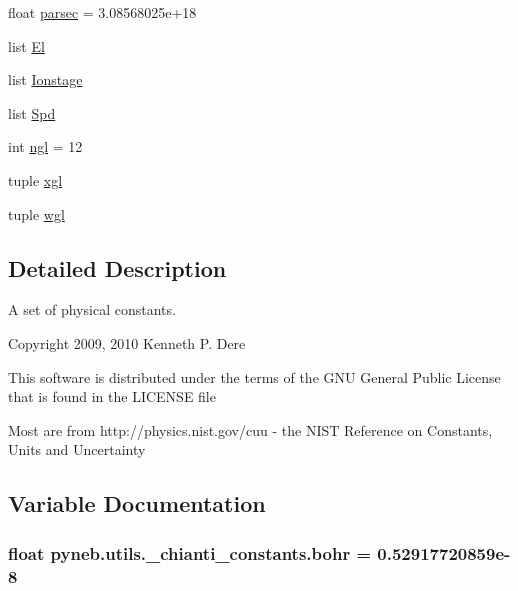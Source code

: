 \begin{DoxyCompactItemize}
$$float \hyperlink{namespacepyneb_1_1utils_1_1__chianti__constants_abcf6354e4070185098bde01f7ce5c8aa}{parsec} = 3.\+08568025e+18
\item 
list \hyperlink{namespacepyneb_1_1utils_1_1__chianti__constants_ab3931b9eb84335e5e2051b39a17271ad}{El}
\item 
list \hyperlink{namespacepyneb_1_1utils_1_1__chianti__constants_a21256617e8a01b45a8d911c01fd8f6fa}{Ionstage}
\item 
list \hyperlink{namespacepyneb_1_1utils_1_1__chianti__constants_a747bb75e4249625a2aefd7060478096f}{Spd}
\item 
int \hyperlink{namespacepyneb_1_1utils_1_1__chianti__constants_aa56aafac98ada2bbf340753caef7378f}{ngl} = 12
\item 
tuple \hyperlink{namespacepyneb_1_1utils_1_1__chianti__constants_af1590059269ec4a1186c9746d22d1201}{xgl}
\item 
tuple \hyperlink{namespacepyneb_1_1utils_1_1__chianti__constants_a46ae7f1b894a2436d928f1280232b724}{wgl}
\end{DoxyCompactItemize}


\subsection{Detailed Description}
\begin{DoxyVerb}A set of physical constants.

Copyright 2009, 2010 Kenneth P. Dere

This software is distributed under the terms of the GNU General Public License
that is found in the LICENSE file


Most are from http://physics.nist.gov/cuu - the NIST Reference on
Constants, Units and Uncertainty\end{DoxyVerb}
 

\subsection{Variable Documentation}
\hypertarget{namespacepyneb_1_1utils_1_1__chianti__constants_a46e1240195152585367ef49738a8af20}{}
\subsubsection[{bohr}]{\setlength{\rightskip}{0pt plus 5cm}float pyneb.\+utils.\+\_\+chianti\+\_\+constants.\+bohr = 0.\+52917720859e-\/8}\label{namespacepyneb_1_1utils_1_1__chianti__constants_a46e1240195152585367ef49738a8af20}


